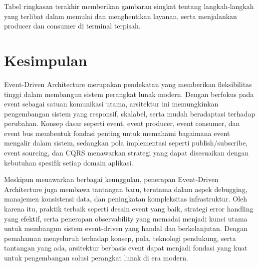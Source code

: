 Tabel ringkasan terakhir memberikan gambaran singkat tentang langkah-langkah yang terlibat dalam memulai dan menghentikan layanan, serta menjalankan producer dan consumer di terminal terpisah.

\section{Kesimpulan}

Event-Driven Architecture merupakan pendekatan yang memberikan fleksibilitas tinggi dalam membangun sistem perangkat lunak modern. Dengan berfokus pada event sebagai satuan komunikasi utama, arsitektur ini memungkinkan pengembangan sistem yang responsif, skalabel, serta mudah beradaptasi terhadap perubahan. Konsep dasar seperti event, event producer, event consumer, dan event bus membentuk fondasi penting untuk memahami bagaimana event mengalir dalam sistem, sedangkan pola implementasi seperti publish/subscribe, event sourcing, dan CQRS menawarkan strategi yang dapat disesuaikan dengan kebutuhan spesifik setiap domain aplikasi.

Meskipun menawarkan berbagai keunggulan, penerapan Event-Driven Architecture juga membawa tantangan baru, terutama dalam aspek debugging, manajemen konsistensi data, dan peningkatan kompleksitas infrastruktur. Oleh karena itu, praktik terbaik seperti desain event yang baik, strategi error handling yang efektif, serta penerapan observability yang memadai menjadi kunci utama untuk membangun sistem event-driven yang handal dan berkelanjutan. Dengan pemahaman menyeluruh terhadap konsep, pola, teknologi pendukung, serta tantangan yang ada, arsitektur berbasis event dapat menjadi fondasi yang kuat untuk pengembangan solusi perangkat lunak di era modern.

